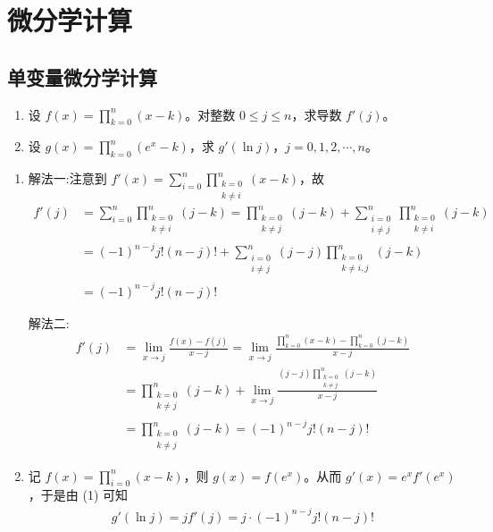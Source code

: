 \documentclass[../../main.tex]{subfiles}
\begin{document}
\section{微分学计算}

\subsection{单变量微分学计算}

\begin{example}
\begin{enumerate}[(1)]
\item 设 \( f(x) = \prod_{k=0}^{n} (x - k) \)。对整数 \( 0 \leqslant j \leqslant n \)，求导数 \( f'(j) \)。

\item 设 \( g(x) = \prod_{k=0}^{n} (e^x - k) \)，求 \( g'(\ln j) \)，\( j = 0, 1, 2, \cdots, n \)。
\end{enumerate}
\end{example}
\begin{solution}
\begin{enumerate}[(1)]
\item {\color{blue} 解法一:}注意到 \( f'(x) = \sum_{i=0}^{n} \prod_{\substack{k=0 \\ k \neq i}}^{n} (x - k) \)，故
\begin{align*}
f'(j) &= \sum_{i=0}^{n} \prod_{\substack{k=0 \\ k \neq i}}^{n} (j - k) = \prod_{\substack{k=0 \\ k \neq j}}^{n} (j - k) + \sum_{\substack{i=0 \\ i \neq j}}^{n} \prod_{\substack{k=0 \\ k \neq i}}^{n} (j - k) \\
&= (-1)^{n - j} j! (n - j)! + \sum_{\substack{i=0 \\ i \neq j}}^{n} (j - j) \prod_{\substack{k=0 \\ k \neq i, j}}^{n} (j - k) \\
&= (-1)^{n - j} j! (n - j)!
\end{align*}

{\color{blue} 解法二:}\begin{align*}
f'(j) &= \lim_{x \to j} \frac{f(x) - f(j)}{x - j} = \lim_{x \to j} \frac{\prod\limits_{k=0}^{n} (x - k) - \prod\limits_{k=0}^{n} (j - k)}{x - j} \\
&= \prod_{\substack{k=0 \\ k \neq j}}^{n} (j - k) + \lim_{x \to j} \frac{(j - j) \prod\limits_{\substack{k=0 \\ k \neq j}}^{n} (j - k)}{x - j} \\
&= \prod_{\substack{k=0 \\ k \neq j}}^{n} (j - k) = (-1)^{n - j} j! (n - j)!
\end{align*}

\item 记 \( f(x) = \prod_{i=0}^{n} (x - k) \)，则 \( g(x) = f(e^x) \)。从而 \( g'(x) = e^x f'(e^x) \)，于是由 (1) 可知
\begin{align*}
g'(\ln j) = j f'(j) = j \cdot (-1)^{n - j} j! (n - j)!
\end{align*}
\end{enumerate}
\end{solution}
\end{document}
